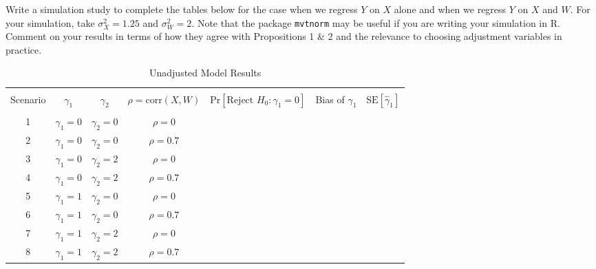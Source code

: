 \documentclass{article}
\begin{document}
Write a simulation study to complete the tables below for the case when we regress $Y$ on $X$ alone and when we regress $Y$ on $X$ and $W$. For your simulation, take $\sigma_X^2 = 1.25$ and $\sigma_W^2 = 2$. Note that the package \texttt{mvtnorm} may be useful if you are writing your simulation in R. Comment on your results in terms of how they agree with Propositions 1 \& 2 and the relevance to choosing adjustment variables in practice.
\begin{table}[H]
\caption{Unadjusted Model Results}
\begin{tabular}{ccccccc}
\hline \\ 
Scenario & $\gamma_1$ & $\gamma_2$ & $\rho = \text{corr}(X, W)$ & $\text{Pr}[\text{Reject } H_0: \gamma_1 = 0]$ & Bias of $\hat{\gamma}_1$ & $\text{SE}[\hat{\gamma}_1]$ \\[10pt]
\hline \\
1 & $\gamma_1 = 0$ & $\gamma_2 = 0$ & $\rho = 0$ & & & \\[10pt]
2 & $\gamma_1 = 0$ & $\gamma_2 = 0$ & $\rho = 0.7$ & & & \\[10pt]
3 & $\gamma_1 = 0$ & $\gamma_2 = 2$ & $\rho = 0$ & & & \\[10pt]
4 & $\gamma_1 = 0$ & $\gamma_2 = 2$ & $\rho = 0.7$ & & & \\[10pt]
5 & $\gamma_1 = 1$ & $\gamma_2 = 0$ & $\rho = 0$ & & & \\[10pt]
6 & $\gamma_1 = 1$ & $\gamma_2 = 0$ & $\rho = 0.7$ & & & \\[10pt]
7 & $\gamma_1 = 1$ & $\gamma_2 = 2$ & $\rho = 0$ & & & \\[10pt]
8 & $\gamma_1 = 1$ & $\gamma_2 = 2$ & $\rho = 0.7$ & & & \\[10pt]
\hline
\end{tabular}
\end{table}
\end{document}
